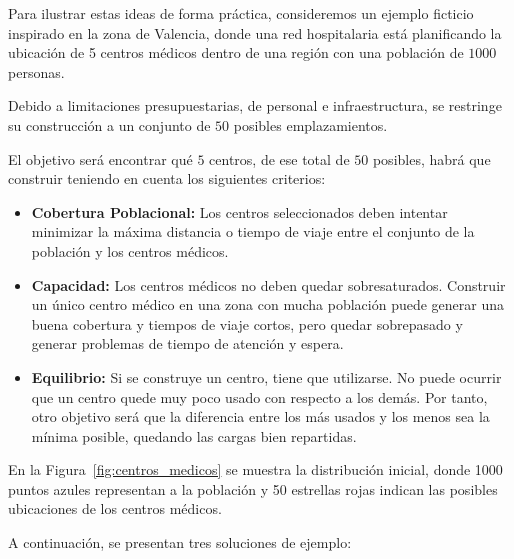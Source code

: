 \documentclass[12pt,a4paper]{book}
\begin{document}
Para ilustrar estas ideas de forma práctica, consideremos un ejemplo ficticio inspirado en la zona de Valencia, donde una red hospitalaria está
planificando la ubicación de 5 centros médicos dentro de una región con una población de $1000$ personas. 

Debido a limitaciones presupuestarias, de personal e infraestructura, se restringe su construcción a un conjunto de $50$ posibles emplazamientos. 

El objetivo será encontrar qué $5$ centros, de ese total de $50$ posibles, habrá que construir teniendo en cuenta los siguientes criterios:

\begin{itemize}
    \item \textbf{Cobertura Poblacional:} Los centros seleccionados deben intentar minimizar la máxima distancia o tiempo de viaje entre el conjunto de la población y los centros médicos.
    \item \textbf{Capacidad:} Los centros médicos no deben quedar sobresaturados. Construir un único centro médico en una zona con mucha población puede generar una buena cobertura y tiempos de viaje cortos, pero quedar sobrepasado y generar problemas de tiempo de atención y espera.
    \item \textbf{Equilibrio:} Si se construye un centro, tiene que utilizarse. No puede ocurrir que un centro quede muy poco usado con respecto a los demás. Por tanto, otro objetivo será que la diferencia entre los más usados y los menos sea la mínima posible, quedando las cargas bien repartidas.
\end{itemize}


En la Figura~\ref{fig:centros_medicos} se muestra la distribución inicial, donde 1000 puntos azules representan a la población y 50 estrellas rojas indican las posibles ubicaciones de los centros médicos.

A continuación, se presentan tres soluciones de ejemplo:
\end{document}
